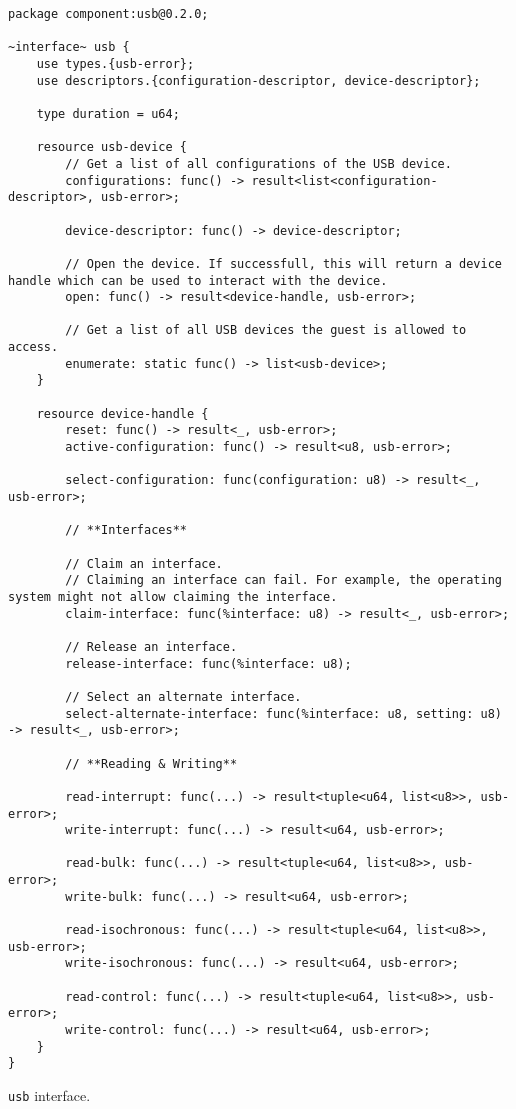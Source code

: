 \begin{code}
\begin{lstlisting}[breaklines, language=wit, tabsize=2]
package component:usb@0.2.0;

~interface~ usb {
	use types.{usb-error};
	use descriptors.{configuration-descriptor, device-descriptor};

	type duration = u64;

	resource usb-device {
		// Get a list of all configurations of the USB device.
		configurations: func() -> result<list<configuration-descriptor>, usb-error>;

		device-descriptor: func() -> device-descriptor;

		// Open the device. If successfull, this will return a device handle which can be used to interact with the device.
		open: func() -> result<device-handle, usb-error>;

		// Get a list of all USB devices the guest is allowed to access.
		enumerate: static func() -> list<usb-device>;
	}

	resource device-handle {
		reset: func() -> result<_, usb-error>;
		active-configuration: func() -> result<u8, usb-error>;

		select-configuration: func(configuration: u8) -> result<_, usb-error>;

		// **Interfaces**

		// Claim an interface.
		// Claiming an interface can fail. For example, the operating system might not allow claiming the interface.
		claim-interface: func(%interface: u8) -> result<_, usb-error>;

		// Release an interface.
		release-interface: func(%interface: u8);

		// Select an alternate interface.
		select-alternate-interface: func(%interface: u8, setting: u8) -> result<_, usb-error>;

		// **Reading & Writing**

		read-interrupt: func(...) -> result<tuple<u64, list<u8>>, usb-error>;
		write-interrupt: func(...) -> result<u64, usb-error>;

		read-bulk: func(...) -> result<tuple<u64, list<u8>>, usb-error>;
		write-bulk: func(...) -> result<u64, usb-error>;

		read-isochronous: func(...) -> result<tuple<u64, list<u8>>, usb-error>;
		write-isochronous: func(...) -> result<u64, usb-error>;

		read-control: func(...) -> result<tuple<u64, list<u8>>, usb-error>;
		write-control: func(...) -> result<u64, usb-error>;
	}
}
\end{lstlisting}
\caption{\texttt{usb} interface.}
\label{code:usb_interface}
\end{code}

